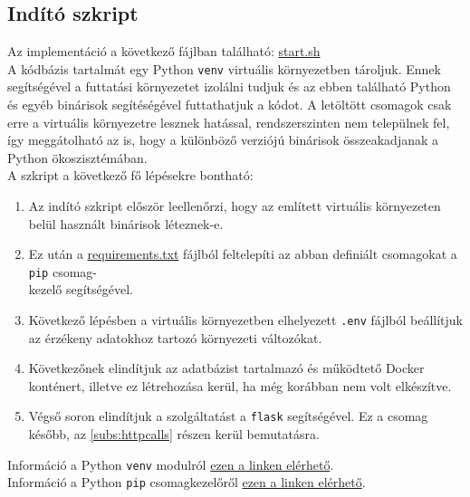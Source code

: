 \documentclass[11pt, a4paper]{article}
\begin{document}
		\subsection{Indító szkript}
			\begin{flushleft}
				\justifying
				Az implementáció a következő fájlban található:
				\color{blue}
				\href{https://github.com/mark182182/GKLB_INTM020_mikroelektromechanikai_rendszerek/blob/main/start.sh}{start.sh}\\
				\color{black}
				A kódbázis tartalmát egy Python \texttt{venv} virtuális környezetben tároljuk. Ennek segítségével a futtatási környezetet izolálni tudjuk és az ebben található Python és egyéb binárisok segítéségével futtathatjuk a kódot. A letöltött csomagok csak erre a virtuális környezetre lesznek hatással, rendszerszinten nem települnek fel, így meggátolható az is, hogy a különböző verziójú binárisok összeakadjanak a Python ökoszisztémában. \\
				A szkript a következő fő lépésekre bontható:
				\begin{enumerate}
					\item Az indító szkript először leellenőrzi, hogy az említett virtuális környezeten belül használt binárisok léteznek-e.
					\item Ez után a
					\color{blue} \href{https://github.com/mark182182/GKLB_INTM020_mikroelektromechanikai_rendszerek/blob/main/requirements.txt}{requirements.txt}
					\color{black} fájlból feltelepíti az abban definiált csomagokat a \texttt{pip} csomag-\\kezelő segítségével.
					\item Következő lépésben a virtuális környezetben elhelyezett \texttt{.env} fájlból beállítjuk az érzékeny adatokhoz tartozó környezeti változókat.
					\item Következőnek elindítjuk az adatbázist tartalmazó és működtető Docker konténert, illetve ez létrehozása kerül, ha még korábban nem volt elkészítve.
					\item Végső soron elindítjuk a szolgáltatást a \texttt{flask} segítségével. Ez a csomag később, az \ref{subs:httpcalls} részen kerül bemutatásra.
				\end{enumerate}
				Információ a Python \texttt{venv} modulról
				\color{blue}
				\href{https://docs.python.org/3/library/venv.html}{ezen a linken elérhető}\color{black}.\\
				Információ a Python \texttt{pip} csomagkezelőről
				\color{blue}
				\href{https://pip.pypa.io/en/stable/user_guide/}{ezen a linken elérhető}\color{black}.
			\end{flushleft}
\end{document}
